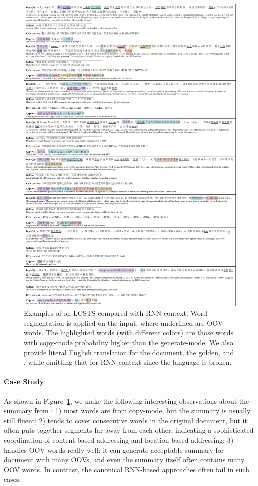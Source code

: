  \begin{figure}[htpb]
   	\centering
          	\includegraphics[width=0.85\linewidth]{figs/copynet/summaryXYZ.pdf}  
          	\caption{\label{cp3.fig.summary} Examples of \copynet on LCSTS compared with RNN context. Word segmentation is applied on the input, where underlined are OOV words. The highlighted words (with different colors) are those words with copy-mode probability higher than the generate-mode.  We also provide literal English translation for the document, the golden, and \copynet, while omitting that for RNN context since the language is broken.} 
  \end{figure}   

 \paragraph{Case Study}
As shown in Figure~\ref{cp3.fig.summary},  we make the following interesting observations about the summary from \copynet: 1) most words  are from copy-mode, but the summary is usually still fluent; 2) \copynet tends to cover consecutive words in the original document, but it often puts together segments far away from each other, indicating a sophisticated coordination of content-based addressing and location-based addressing; 3) \copynet handles OOV words really well: it can generate acceptable summary for document with many OOVs, and even the summary itself often contains many OOV words. In contrast, the canonical RNN-based approaches often fail in such cases.

